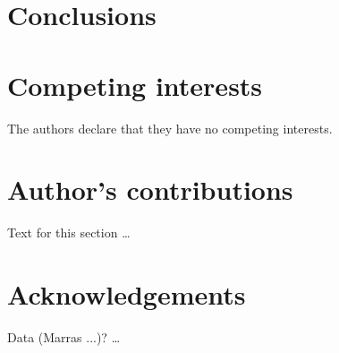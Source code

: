 \documentclass{bmcart}
\begin{document}
\section*{Conclusions}


\begin{backmatter}

\section*{Competing interests}
  The authors declare that they have no competing interests.

\section*{Author's contributions}
    Text for this section \ldots

\section*{Acknowledgements}
  Data (Marras ...)? \ldots




\end{backmatter}
\end{document}

